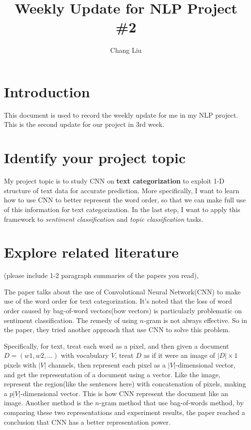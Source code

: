 \documentclass{article}
\title{Weekly Update for NLP Project \#2}
\author{Chang Liu}
\begin{document}
\maketitle

\section{Introduction}

This document is used to record the weekly update for me in my NLP project. This is the second update for our project in 3rd week.

\section{Identify your project topic}

My project topic is to study CNN on \textbf{text categorization} to exploit 1-D structure of text data for accurate prediction. More specifically, I want to learn how to use CNN to better represent the word order, so that we can make full use of this information for text categorization. In the last step, I want to apply this framework to \textit{sentiment classification} and \textit{topic classification} tasks.  

\section{Explore related literature} 
(please include 1-2 paragraph summaries of the papers you read),
 
The paper talks about the use of Convolutional Neural Network(CNN) to make use of the word order for text categorization. It's noted that the loss of word order caused by bag-of-word vectors(bow vectors) is particularly problematic on sentiment classification. The remedy of using $n$-gram is not always effective. So in the paper, they tried another approach that use CNN to solve this problem.

Specifically, for text, treat each word as a pixel, and then given a document $D=(w1, w2, . . .)$ with vocabulary $V$, treat $D$ as if it were an image of $|D| \times 1$ pixels with $|V|$ channels, then represent each pixel as a $|V|$-dimensional vector, and get the representation of a document using a vector. Like the image, represent the region(like the sentences here) with concatenation of pixels, making a $p|V|$-dimensional vector. This is how CNN represent the document like an image. Another method is the $n$-gram method that use bag-of-words method, by comparing these two representations and experiment results, the paper reached a conclusion that CNN has a better representation power.
\end{document}
